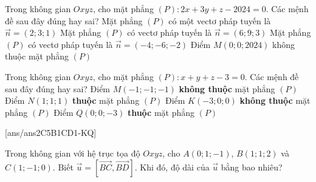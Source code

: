 \begin{ex}%
	Trong không gian $O x y z$, cho mặt phẳng $(P)\colon 2 x+3 y+z-2024=0$. Các mệnh đề sau đây đúng hay sai?
	\choiceTF
	{\True Mặt phẳng $(P)$ có một vectơ pháp tuyến là $\overrightarrow{n}=(2; 3; 1)$}
	{\True Mặt phẳng $(P)$ có vectơ pháp tuyến là $\overrightarrow{n}=(6; 9; 3)$}
	{\True Mặt phẳng $(P)$ có vectơ pháp tuyến là $\overrightarrow{n}=(-4;-6;-2)$}
	{Điểm $M(0; 0; 2024)$ không thuộc mặt phẳng $(P)$}
\end{ex}
\begin{ex}%
	Trong không gian $O x y z$, cho mặt phẳng $(P)\colon x+y+z-3=0$. Các mệnh đề sau đây đúng hay sai?
	\choiceTF
	{\True Điểm $M(-1;-1;-1)$ \textbf{không thuộc} mặt phẳng $(P)$}
	{\True Điểm $N(1; 1; 1)$ \textbf{thuộc} mặt phẳng $(P)$}
	{\True Điểm $K(-3; 0; 0)$ \textbf{không thuộc} mặt phẳng $(P)$}
	{Điểm $Q(0; 0;-3)$ \textbf{thuộc} mặt phẳng $(P)$}
\end{ex}
\TNSA
{}[ans/ans2C5B1CD1-KQ]
\begin{ex}%
	Trong không gian với hệ trục tọa độ $O x y z$, cho $A(0; 1;-1)$, $B(1; 1; 2)$ và $C(1;-1; 0)$. Biết  $\vec{u}=\left[\overrightarrow{B C}, \overrightarrow{B D}\right]$. Khi đó, độ dài của $\vec{u}$ bằng bao nhiêu?
\end{ex}

